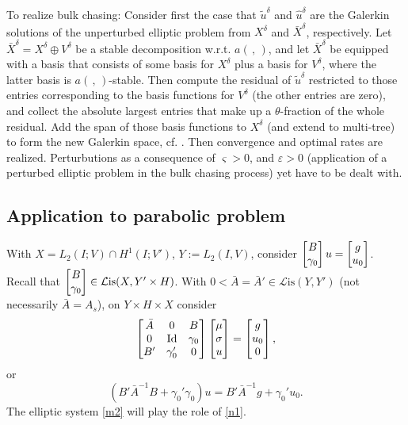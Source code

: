 \documentclass{amsart}
\theoremstyle{definition}
\theoremstyle{remark}
\numberwithin{equation}{section}
\newcommand{\eps}{\varepsilon}
\newcommand{\cL}{\mathcal L}
\newcommand{\Lis}{\cL\mathrm{is}}
\newcommand{\identity}{\mathrm{Id}}
\newcommand{\be}{\begin{equation}}
\newcommand{\ee}{\end{equation}}
\newcommand{\1}{\mathbb 1}
\begin{document}
To realize bulk chasing: Consider first the case that $\tilde{u}^\delta$ and $\hat{u}^\delta$ are the Galerkin solutions of the unperturbed elliptic problem from $X^\delta$ and $\bar{X}^\delta$, respectively.
Let $\bar{X}^\delta=X^\delta \oplus V^\delta$ be a stable decomposition w.r.t. $a(\,,\,)$, and let $\bar{X}^\delta$ be equipped with a basis that consists of some basis for $X^\delta$ plus a basis for $V^\delta$, where the latter basis is $a(\,,\,)$-stable.
Then compute the residual of $\tilde{u}^\delta$ restricted to those entries corresponding to the basis functions for $V^\delta$ (the other entries are zero), and collect the absolute largest entries that make up a $\theta$-fraction of the whole residual.
Add the span of those basis functions to  $X^\delta$ (and extend to multi-tree)  to form the new Galerkin space, cf. \cite[Lemmas 5 and 6, and Proposition 5]{249.92}.
Then convergence and optimal rates are realized.
Perturbutions as a consequence of $\varsigma>0$, and $\eps>0$ (application of a perturbed elliptic problem in the bulk chasing process)
 yet have to be dealt with.



\subsection{Application to parabolic problem}
With $X=L_2(I;V) \cap H^1(I;V')$, $Y:=L_2(I,V)$, consider $\left[\begin{array}{@{}c@{}} B \\ \gamma_0\end{array}\right] u=\left[\begin{array}{@{}c@{}} g \\ u_0\end{array} \right]$. Recall that $\left[\begin{array}{@{}c@{}} B \\ \gamma_0\end{array}\right] \in \Lis(X,Y' \times H)$.
With $0<\bar{A}=\bar{A}' \in \Lis(Y,Y')$ (not necessarily $\bar{A}=A_s$), on $Y \times H \times X$ consider
\be \label{m1}
\left[\begin{array}{@{}ccc@{}} \bar{A} & 0 & B\\ 0 & \identity & \gamma_0\\ B' & \gamma_0' & 0\end{array}\right]
\left[\begin{array}{@{}c@{}} \mu \\ \sigma \\ u \end{array}\right]=
\left[\begin{array}{@{}c@{}} g \\ u_0 \\ 0 \end{array}\right],
\ee
or
\be \label{m2}
(B' \bar{A}^{-1} B+\gamma_0'\gamma_0)u=B' \bar{A}^{-1}g+\gamma_0' u_0.
\ee
The elliptic system \eqref{m2} will play the role of \eqref{n1}.
\end{document}
